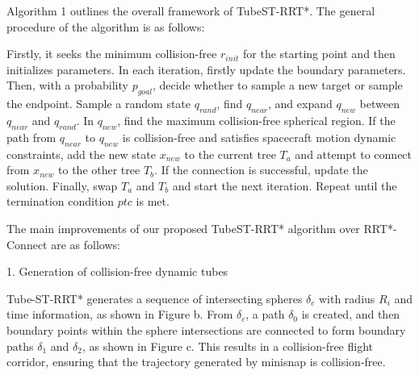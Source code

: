\documentclass[times,authoryear]{elsarticle}
\newcommand{\Input}{\item[\textbf{Input:}]}
\renewcommand{\Output}{\item[\textbf{Output:}]}
\begin{document}
Algorithm 1 outlines the overall framework of TubeST-RRT*. The general procedure of the algorithm is as follows:

Firstly, it seeks the minimum collision-free $r_{init}$ for the starting point and then initializes parameters.
In each iteration, firstly update the boundary parameters. Then, with a probability $p_{goal}$, decide whether to sample a new target or sample the endpoint. Sample a random state $q_{rand}$, find $q_{near}$, and expand $q_{new}$ between $q_{near}$ and $q_{rand}$. In $q_{new}$, find the maximum collision-free spherical region. If the path from $q_{near}$ to $q_{new}$ is collision-free and satisfies spacecraft motion dynamic constraints, add the new state $x_{new}$ to the current tree $T_{a}$ and attempt to connect from $x_{new}$ to the other tree $T_{b}$. If the connection is successful, update the solution. Finally, swap $T_{a}$ and $T_{b}$ and start the next iteration. Repeat until the termination condition $ptc$ is met.


		

The main improvements of our proposed TubeST-RRT* algorithm over RRT*-Connect are as follows:

1. Generation of collision-free dynamic tubes

Tube-ST-RRT* generates a sequence of intersecting spheres $\delta_{c}$ with radius $R_i$ and time information, as shown in Figure b. From $\delta_{c}$, a path $\delta_{0}$ is created, and then boundary points within the sphere intersections are connected to form boundary paths $\delta_{1}$ and $\delta_{2}$, as shown in Figure c. This results in a collision-free flight corridor, ensuring that the trajectory generated by minisnap is collision-free.
\end{document}
